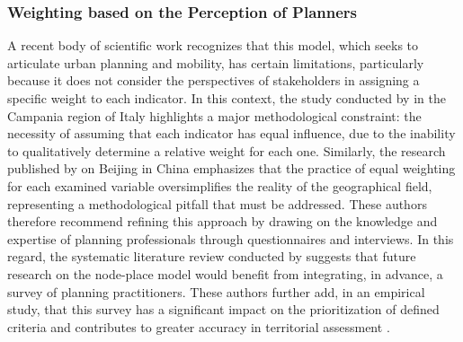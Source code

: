 \begin{refsegment}
\subsubsection*{Weighting based on the Perception of Planners
    \label{chap6:ponderation-subjective}
    }

A recent body of scientific work recognizes that this model, which seeks to articulate urban planning and mobility, has certain limitations, particularly because it does not consider the perspectives of stakeholders in assigning a specific weight to each indicator. In this context, the study conducted by \textcolor{blue}{\textcite[119]{nigro_land_2019}} in the Campania region of Italy highlights a major methodological constraint: the necessity of assuming that each indicator has equal influence, due to the inability to qualitatively determine a relative weight for each one. Similarly, the research published by \textcolor{blue}{\textcite[9]{liao_evaluating_2022}} on Beijing in China emphasizes that the practice of equal weighting for each examined variable oversimplifies the reality of the geographical field, representing a methodological pitfall that must be addressed. These authors therefore recommend refining this approach by drawing on the knowledge and expertise of planning professionals through questionnaires and interviews. In this regard, the systematic literature review conducted by \textcolor{blue}{\textcite[394]{ibrahim_planning_2022}} suggests that future research on the node-place model would benefit from integrating, in advance, a survey of planning practitioners. These authors further add, in an empirical study, that this survey has a significant impact on the prioritization of defined criteria and contributes to greater accuracy in territorial assessment \textcolor{blue}{\autocite[254]{ibrahim_measuring_2023}}.%


\end{refsegment}
